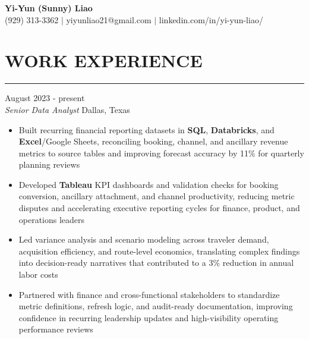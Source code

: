 \documentclass[11pt,letterpaper]{article}
\begin{document}
\begin{center}
  {\Large\textbf{Yi-Yun (Sunny) Liao}}\\[-2pt]
  (929) 313-3362 $|$ yiyunliao21@gmail.com $|$ linkedin.com/in/yi-yun-liao/
\end{center}

\vspace{-4pt}
\section*{WORK EXPERIENCE}
\vspace{-8pt}\noindent\rule{\textwidth}{0.8pt}

\vspace{2pt}
 \hfill August 2023 - present\\[-1pt]
\textit{Senior Data Analyst} \hfill Dallas, Texas
\begin{itemize}[leftmargin=1.5em, rightmargin=0pt, itemsep=0pt, topsep=0pt, parsep=0pt]
  \item \justifying Built recurring financial reporting datasets in \textbf{SQL}, \textbf{Databricks}, and \textbf{Excel}/Google Sheets, reconciling booking, channel, and ancillary revenue metrics to source tables and improving forecast accuracy by 11\% for quarterly planning reviews
  \item \justifying Developed \textbf{Tableau} KPI dashboards and validation checks for booking conversion, ancillary attachment, and channel productivity, reducing metric disputes and accelerating executive reporting cycles for finance, product, and operations leaders
  \item \justifying Led variance analysis and scenario modeling across traveler demand, acquisition efficiency, and route-level economics, translating complex findings into decision-ready narratives that contributed to a 3\% reduction in annual labor costs
  \item \justifying Partnered with finance and cross-functional stakeholders to standardize metric definitions, refresh logic, and audit-ready documentation, improving confidence in recurring leadership updates and high-visibility operating performance reviews
\end{itemize}
\end{document}
